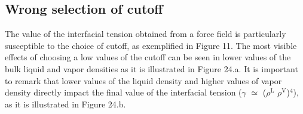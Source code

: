 \documentclass[9pt,bestpractices]{livecoms}
\begin{document}
\subsection{Wrong selection of cutoff}

The value of the interfacial tension obtained from a force field is
particularly susceptible to the choice of cutoff, as exemplified in Figure 11.
The most visible effects of choosing a low values of the cutoff can be seen in
lower values of the bulk liquid and vapor densities as it is illustrated in
Figure 24.a. It is important to remark that lower values of the liquid density
and higher values of vapor density directly impact the final value of the
interfacial tension ({${\gamma}$}  ${\simeq}$ (${\rho}$$^{\mathrm{L}}$
\textendash{} ${\rho}$$^{\mathrm{V}}$)$^{4}$), as it is illustrated in Figure
24.b.
\end{document}
